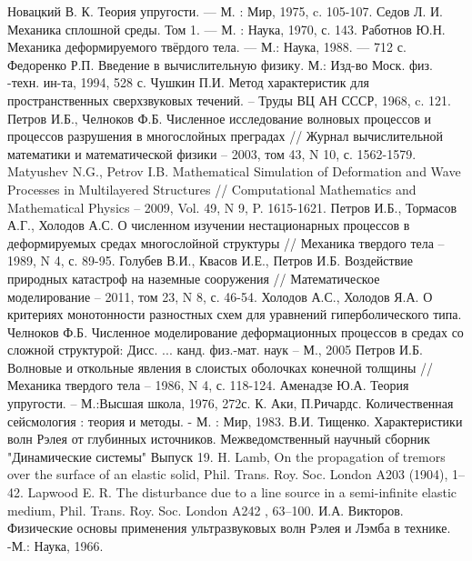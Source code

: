 \begin{thebibliography}{99}
Новацкий В. К. Теория упругости. — М. : Мир, 1975, c. 105-107.
Седов Л. И. Механика сплошной среды. Том 1. — М. : Наука, 1970, с. 143.
Работнов Ю.Н. Механика деформируемого твёрдого тела. — М.: Наука, 1988. — 712 с.
Федоренко Р.П. Введение в вычислительную физику. М.:
Изд-во Моск. физ. -техн. ин-та, 1994, 528 с.
Чушкин П.И. Метод характеристик для пространственных сверхзвуковых течений. –  Труды ВЦ АН СССР, 1968, c. 121.
Петров И.Б., Челноков Ф.Б. Численное исследование волновых процессов и процессов разрушения в многослойных преградах // Журнал вычислительной математики и математической физики – 2003, том 43, N 10, с. 1562-1579.
Matyushev N.G., Petrov I.B. Mathematical Simulation of Deformation and Wave Processes in Multilayered Structures // Computational Mathematics and Mathematical Physics – 2009, Vol. 49, N 9, P. 1615-1621.
Петров  И.Б., Тормасов А.Г., Холодов А.С. О численном изучении нестационарных процессов в деформируемых средах многослойной структуры // Механика твердого тела – 1989, N 4, с. 89-95.
Голубев В.И., Квасов И.Е., Петров И.Б. Воздействие природных катастроф на наземные сооружения // Математическое моделирование – 2011, том 23, N 8, с. 46-54.
Холодов А.С., Холодов Я.А. О критериях монотонности разностных
схем для уравнений гиперболического типа. 
Челноков Ф.Б. Численное моделирование деформационных процессов в средах со сложной структурой: Дисс. ... канд. физ.-мат. наук – М., 2005
Петров И.Б. Волновые и откольные явления в слоистых оболочках конечной толщины // Механика твердого тела – 1986, N 4, с. 118-124.
Аменадзе Ю.А. Теория упругости. – М.:Высшая школа, 1976, 272с.
К. Аки, П.Ричардс. Количественная сейсмология : теория и методы. - М. : Мир, 1983.
В.И. Тищенко. Характеристики волн Рэлея от глубинных источников. Межведомственный научный сборник "Динамические системы" Выпуск 19.
H. Lamb, On the propagation of tremors over the surface of an elastic solid, Phil. Trans. Roy. Soc. London A203 (1904), 1–42.
Lapwood E. R. The disturbance due to a line source in a semi-infinite elastic medium, Phil. Trans. Roy. Soc. London A242 , 63–100.
И.А. Викторов. Физические основы применения ультразвуковых волн Рэлея и Лэмба в технике. -М.: Наука, 1966.


\end{thebibliography}

